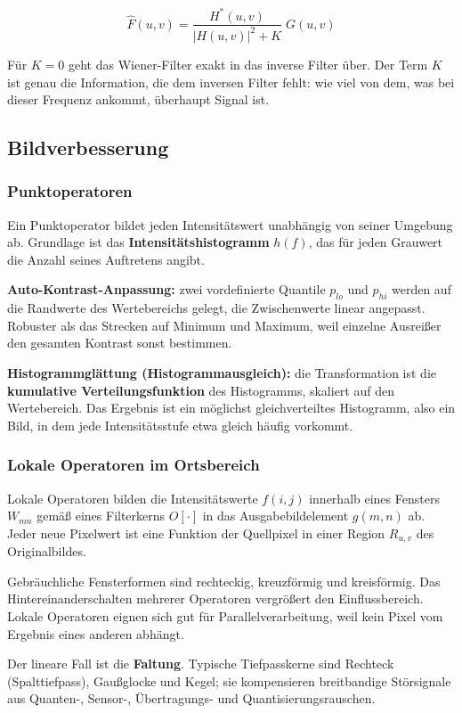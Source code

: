 \documentclass[12pt, a4paper]{article}
\begin{document}
\[
\hat{F}(u,v) = \frac{H^{*}(u,v)}{|H(u,v)|^{2} + K}\; G(u,v)
\]

Für $K = 0$ geht das Wiener-Filter exakt in das inverse Filter über. Der Term $K$ ist
genau die Information, die dem inversen Filter fehlt: wie viel von dem, was bei dieser
Frequenz ankommt, überhaupt Signal ist.

\subsection{Bildverbesserung}

\subsubsection*{Punktoperatoren}

Ein Punktoperator bildet jeden Intensitätswert unabhängig von seiner Umgebung ab.
Grundlage ist das \textbf{Intensitätshistogramm} $h(f)$, das für jeden Grauwert die
Anzahl seines Auftretens angibt.

\textbf{Auto-Kontrast-Anpassung:} zwei vordefinierte Quantile $p_{lo}$ und $p_{hi}$
werden auf die Randwerte des Wertebereichs gelegt, die Zwischenwerte linear angepasst.
Robuster als das Strecken auf Minimum und Maximum, weil einzelne Ausreißer den
gesamten Kontrast sonst bestimmen.

\textbf{Histogrammglättung (Histogrammausgleich):} die Transformation ist die
\textbf{kumulative Verteilungsfunktion} des Histogramms, skaliert auf den Wertebereich.
Das Ergebnis ist ein möglichst gleichverteiltes Histogramm, also ein Bild, in dem jede
Intensitätsstufe etwa gleich häufig vorkommt.

\subsubsection*{Lokale Operatoren im Ortsbereich}

Lokale Operatoren bilden die Intensitätswerte $f(i,j)$ innerhalb eines Fensters
$W_{mn}$ gemäß eines Filterkerns $O[\cdot]$ in das Ausgabebildelement $g(m,n)$ ab.
Jeder neue Pixelwert ist eine Funktion der Quellpixel in einer Region $R_{u,v}$ des
Originalbildes.

Gebräuchliche Fensterformen sind rechteckig, kreuzförmig und kreisförmig. Das
Hintereinanderschalten mehrerer Operatoren vergrößert den Einflussbereich. Lokale
Operatoren eignen sich gut für Parallelverarbeitung, weil kein Pixel vom Ergebnis eines
anderen abhängt.

Der lineare Fall ist die \textbf{Faltung}. Typische Tiefpasskerne sind Rechteck
(Spalttiefpass), Gaußglocke und Kegel; sie kompensieren breitbandige Störsignale aus
Quanten-, Sensor-, Übertragungs- und Quantisierungsrauschen.
\end{document}
